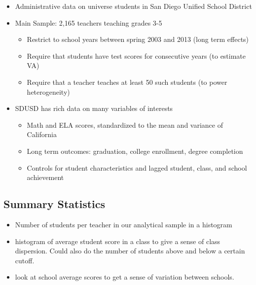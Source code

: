 \documentclass{article}
\theoremstyle{definition}
\theoremstyle{definition}
\theoremstyle{definition}
\theoremstyle{definition}
\begin{document}
\begin{itemize}
    \item Administrative data on universe students in San Diego Unified School District

    \item Main Sample: 2,165 teachers teaching grades 3-5
        
    \begin{itemize}
        \item Restrict to school years between spring 2003 and 2013 (long term effects)
        \item Require that students have test scores for consecutive years (to estimate VA)
        \item Require that a teacher teaches at least 50 such students (to power heterogeneity)
    \end{itemize}    
        
    \item SDUSD has rich data on many variables of interests
        \begin{itemize}
        \item Math and ELA scores, standardized to the mean and variance of California
        \item Long term outcomes: graduation, college enrollment, degree completion
        \item Controls for student characteristics and lagged student, class, and school achievement
    \end{itemize}  
\end{itemize}

    \subsection{Summary Statistics}
    \begin{itemize}
        \item Number of students per teacher in our analytical sample in a histogram 
        \item histogram of average student score in a class to give a sense of class dispersion. Could also do the number of students above and below a certain cutoff. 
        \item look at school average scores to get a sense of variation between schools. 
    \end{itemize}


\end{document}
